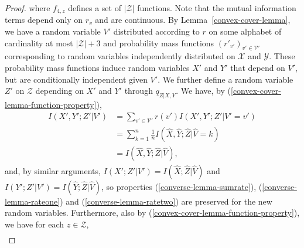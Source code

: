 \documentclass[journal]{IEEEtran}
\newcommand{\channelpmf}{q}
\newcommand{\generalpmf}{r}
\newcommand{\generalfunction}{f}
\newcommand{\channelInOne}{X}
\newcommand{\channelInOneAlph}{\mathcal{X}}
\newcommand{\channelInTwo}{Y}
\newcommand{\channelInTwoAlph}{\mathcal{Y}}
\newcommand{\channelOut}{Z}
\newcommand{\channelOutAlph}{\mathcal{Z}}
\newcommand{\channelOutAlphElement}{z}
\newcommand{\codebookBlocklength}{n}
\newcommand{\blockIndex}{k}
\newcommand{\mutualInformationConditional}[3]{I(#1;#2|#3)}
\newcommand{\cardinality}[1]{\lvert #1 \rvert}
\newcommand{\timeSharingRV}{V}
\newcommand{\timeSharingAlph}{\mathcal{V}}
\newcommand{\timeSharingAlphElement}{v}
\begin{document}
\begin{proof}
where $\generalfunction_{4,\channelOutAlphElement}$ defines a set of $\cardinality{\channelOutAlph}$ functions. Note that the mutual information terms depend only on $\generalpmf_\timeSharingAlphElement$ and are continuous. By Lemma~\ref{convex-cover-lemma}, we have a random variable $\timeSharingRV'$ distributed according to $\generalpmf$ on some alphabet of cardinality at most $\cardinality{\channelOutAlph} + 3$ and probability mass functions $(\generalpmf'_{\timeSharingAlphElement'})_{\timeSharingAlphElement' \in \timeSharingAlph'}$ corresponding to random variables independently distributed on $\channelInOneAlph$ and $\channelInTwoAlph$. These probability mass functions induce random variables $\channelInOne'$ and $\channelInTwo'$ that depend on $\timeSharingRV'$, but are conditionally independent given $\timeSharingRV'$. We further define a random variable $\channelOut'$ on $\channelOutAlph$ depending on $\channelInOne'$ and $\channelInTwo'$ through $\channelpmf_{\channelOut | \channelInOne, \channelInTwo}$. We have, by (\ref{convex-cover-lemma-function-property}),
\begin{align*}
\mutualInformationConditional{\channelInOne', \channelInTwo'}{\channelOut'}{\timeSharingRV'}
&=
\sum\limits_{\timeSharingAlphElement' \in \timeSharingAlph'}
\generalpmf(\timeSharingAlphElement')
\mutualInformationConditional{\channelInOne', \channelInTwo'}{\channelOut'}{\timeSharingRV'=\timeSharingAlphElement'}
\\
&=
\sum\limits_{\blockIndex=1}^\codebookBlocklength
  \frac{1}{\codebookBlocklength}
  \mutualInformationConditional{\hat{\channelInOne}, \hat{\channelInTwo}}{\hat{\channelOut}}{\hat{\timeSharingRV} = \blockIndex}
\\
&=
\mutualInformationConditional{\hat{\channelInOne}, \hat{\channelInTwo}}{\hat{\channelOut}}{\hat{\timeSharingRV}},
\end{align*}
and, by similar arguments, $\mutualInformationConditional{\channelInOne'}{\channelOut'}{\timeSharingRV'} = \mutualInformationConditional{\hat{\channelInOne}}{\hat{\channelOut}}{\hat{\timeSharingRV}}$ and $\mutualInformationConditional{\channelInTwo'}{\channelOut'}{\timeSharingRV'} = \mutualInformationConditional{\hat{\channelInTwo}}{\hat{\channelOut}}{\hat{\timeSharingRV}}$, so properties (\ref{converse-lemma-sumrate}), (\ref{converse-lemma-rateone}) and (\ref{converse-lemma-ratetwo}) are preserved for the new random variables. Furthermore, also by (\ref{convex-cover-lemma-function-property}), we have for each $\channelOutAlphElement \in \channelOutAlph$,
\begin{align*}

\end{align*}
\end{proof}
\end{document}
